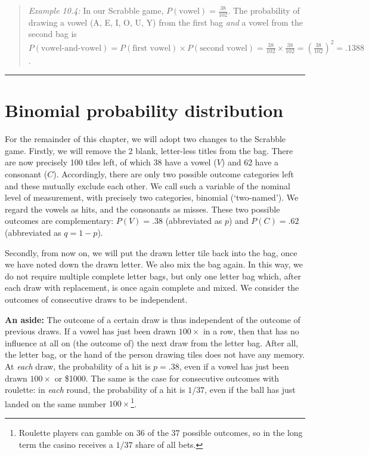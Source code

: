 \documentclass[
]{book}
\begin{document}
\begin{quote}
\emph{Example 10.4:}
In our Scrabble game, \(P(\textrm{vowel})=\frac{38}{102}\). The probability
of drawing a vowel (A, E, I, O, U, Y) from the first bag \emph{and} a
vowel from the second bag is
\(P(\textrm{vowel-and-vowel})=P(\textrm{first vowel}) \times P(\textrm{second vowel})=\frac{38}{102} \times \frac{38}{102} = (\frac{38}{102})^2 = .1388\).
\end{quote}

\begin{center}\rule{0.5\linewidth}{0.5pt}\end{center}

\section{Binomial probability distribution}\label{sec:binomial-distribution}

For the remainder of this chapter, we will adopt two changes to the
Scrabble game. Firstly, we will remove the 2 blank, letter-less titles
from the bag. There are now precisely 100 tiles left, of which
38 have a vowel (\(V\)) and 62 have a consonant (\(C\)). Accordingly, there are only
two possible outcome categories left and these mutually exclude each other.
We call such a variable of the nominal level of measurement,
with precisely two categories, binomial (`two-named'). We regard the
vowels as hits, and the consonants as
misses. These two possible outcomes are complementary:
\(P(V)=.38\) (abbreviated as \(p\)) and \(P(C)=.62\) (abbreviated as
\(q=1-p\)).

Secondly, from now on, we will put the drawn letter tile back into the bag,
once we have noted down the drawn letter. We also mix the bag again.
In this way, we do not require
multiple complete letter bags, but only one letter bag which, after each
draw with replacement, is once again complete and mixed.
We consider the outcomes of consecutive draws to be
independent.

\textbf{An aside:} The outcome of a certain draw is thus independent of the outcome
of previous draws. If a vowel has just been drawn \(100\times\) in a row,
then that has no influence at all on (the outcome of)
the next draw from the letter bag. After all, the
letter bag, or the hand of the person drawing tiles does not have any memory. At
\emph{each} draw, the probability of a hit is \(p=.38\), even if a vowel
has just been drawn \(100\times\) or \$1000\times. The same is the case
for consecutive outcomes with roulette: in \emph{each} round, the probability
of a hit is \(1/37\), even if the ball has just landed on the same number \(100\times\)\footnote{Roulette players can gamble on 36 of the 37 possible outcomes, so in the long term the casino receives a \(1/37\) share of all bets.}.
\end{document}
